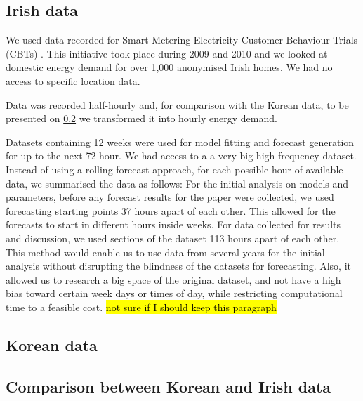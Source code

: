 \documentclass[preprint,3p,12pt,authoryear]{elsarticle}
\begin{document}
\subsection{Irish data}
\label{ss:ir}
We used data recorded for Smart Metering Electricity Customer Behaviour Trials (CBTs) \citep{irish_data}.
This initiative took place during 2009 and 2010 and we looked at domestic energy demand for over 1,000 anonymised Irish homes.
We had no access to specific location data.

Data was recorded half-hourly and, for comparison with the Korean data, to be presented on \ref{ss:ko} we transformed it into hourly energy demand.

Datasets containing 12 weeks were used for model fitting and forecast generation for up to the next 72 hour.
We had access to a a very big high frequency dataset.
Instead of using a rolling forecast approach, for each possible hour of available data, we summarised the data as follows:
For the initial analysis on models and parameters, before any forecast results for the paper were collected, we used forecasting starting points 37 hours apart of each other.
This allowed for the forecasts to start in different hours inside weeks.
For data collected for results and discussion, we used sections of the dataset 113 hours apart of each other.
This method would enable us to use data from several years for the initial analysis without disrupting the blindness of the datasets for forecasting.
Also, it allowed us to research a big space of the original dataset, and not have a high bias toward certain week days or times of day, while restricting computational time to a feasible cost.
\hl{not sure if I should keep this paragraph}

\subsection{Korean data}
\label{ss:ko}

\subsection{Comparison between Korean and Irish data}
\label{ss:data_compare}

\end{document}
